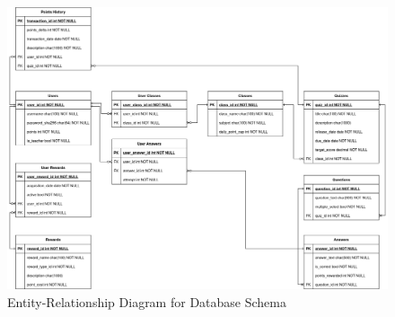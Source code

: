 \begin{figure}[H]
    \centering
    \includegraphics[width=0.7\linewidth]{PUT INDIVIDUAL SECTIONS HERE/images/466_ER_Diagram.drawio.png}
    \caption{Entity-Relationship Diagram for Database Schema}
    \label{ER-diagram}
\end{figure}


